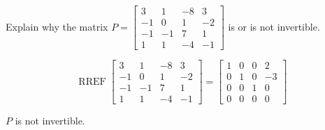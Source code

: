
\begin{exerciseStatement}


Explain why the matrix \(P= \left[\begin{array}{cccc}
3 & 1 & -8 & 3 \\
-1 & 0 & 1 & -2 \\
-1 & -1 & 7 & 1 \\
1 & 1 & -4 & -1
\end{array}\right] \) is or is not invertible.


\end{exerciseStatement}
    
\begin{exerciseAnswer} 


\[\operatorname{RREF} \left[\begin{array}{cccc}
3 & 1 & -8 & 3 \\
-1 & 0 & 1 & -2 \\
-1 & -1 & 7 & 1 \\
1 & 1 & -4 & -1
\end{array}\right] = \left[\begin{array}{cccc}
1 & 0 & 0 & 2 \\
0 & 1 & 0 & -3 \\
0 & 0 & 1 & 0 \\
0 & 0 & 0 & 0
\end{array}\right] \]

\(P\) is not invertible.
\end{exerciseAnswer}
    
